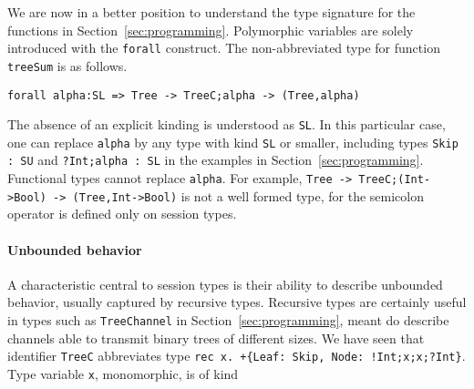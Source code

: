 We are now in a better position to understand the type signature for
the functions in Section~\ref{sec:programming}.  Polymorphic variables
are solely introduced with the \lstinline|forall| construct. The
non-abbreviated type for function \lstinline|treeSum| is as follows.
%
\begin{lstlisting}
forall alpha:SL => Tree -> TreeC;alpha -> (Tree,alpha)
\end{lstlisting}
%
The absence of an explicit kinding is understood as \lstinline|SL|. In
this particular case, one can replace \lstinline|alpha| by any type
with kind \lstinline|SL| or smaller, including types
\lstinline|Skip : SU| and \lstinline|?Int;alpha : SL| in the examples
in Section~\ref{sec:programming}. Functional types cannot replace
\lstinline|alpha|. For example,
%
\lstinline|Tree -> TreeC;(Int->Bool) -> (Tree,Int->Bool)|
is not a well formed type, for the semicolon operator is defined only
on session types.

\paragraph{Unbounded behavior}

A characteristic central to session types is their ability to describe
unbounded behavior, usually captured by recursive types. Recursive
types are certainly useful in types such as \lstinline|TreeChannel| in
Section~\ref{sec:programming}, meant do describe channels able to
transmit binary trees of different sizes. We have seen that identifier
\lstinline|TreeC| abbreviates type
%
\lstinline|rec x. +{Leaf: Skip, Node: !Int;x;x;?Int}|.  Type variable
\lstinline|x|, monomorphic, is of kind

